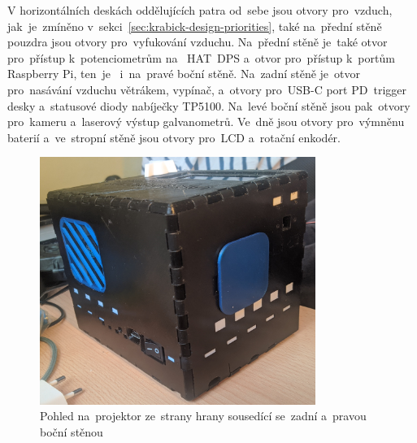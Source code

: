 V horizontálních deskách oddělujících patra od~sebe jsou otvory pro~vzduch, jak~je~zmíněno v~sekci~\ref{sec:krabick-design-priorities}, také na~přední stěně pouzdra jsou otvory pro~vyfukování vzduchu. Na~přední stěně je~také otvor pro~přístup k~potenciometrům na ~HAT~DPS a~otvor pro~přístup k~portům Raspberry Pi, ten~je ~i~na~pravé boční stěně.
Na~zadní stěně je~otvor pro~nasávání vzduchu větrákem, vypínač, a~otvory pro~USB-C port PD~trigger desky a~statusové diody nabíječky TP5100. Na~levé boční stěně jsou pak~otvory pro~kameru a~laserový výstup galvanometrů. Ve~dně jsou otvory pro~výmněnu baterií a~ve~stropní stěně jsou otvory pro~LCD a~rotační enkodér.

\begin{figure}[htb]
  \centering
  \includegraphics[width=0.8\textwidth]{img/hw_sides_backleft.jpg}
  \caption{\label{fig:hw_sides_backleft.jpg} Pohled na~projektor ze~strany hrany sousedící se~zadní a~pravou boční stěnou}
\end{figure}


